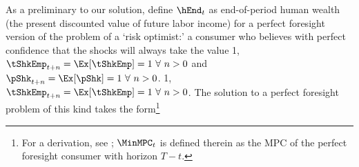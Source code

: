 As a preliminary to our solution, define $\hEnd_{t}$ as
end-of-period human wealth (the present discounted value
of future labor income) for a perfect foresight version of the problem
of a `risk optimist:' a consumer who believes with perfect confidence
that the shocks will always take the value
\pShkOn
{1, $\tShkEmp_{t+n} = \Ex[\tShkEmp]=1~\forall~n>0$ and $\pShk_{t+n} = \Ex[\pShk]=1~\forall~n>0$.}
{1, $\tShkEmp_{t+n} = \Ex[\tShkEmp]=1~\forall~n>0$.}
The solution to a perfect foresight problem of this kind takes the
form\footnote{For a derivation, see \cite{BufferStockTheory}; $\MinMPC_{t}$ is defined therein as the MPC of the perfect foresight consumer with horizon $T-t$.}
